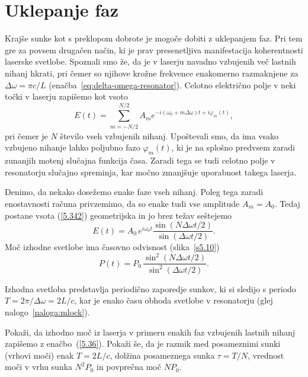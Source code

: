\section{Uklepanje faz}
\label{chap:Uklepanje}
Krajše sunke kot s preklopom dobrote je mogoče dobiti z uklepanjem faz.
Pri tem gre za povsem drugačen način, ki je prav presenetljiva manifestacija 
koherentnosti laserske svetlobe. Spoznali smo že, da je v laserju navadno 
vzbujenih več lastnih nihanj hkrati, pri čemer so njihove krožne frekvence 
enakomerno razmaknjene za $\Delta \omega =\pi c/L$ 
(enačba~\ref{eq:delta-omega-resonator}). Celotno električno
polje v neki točki v laserju zapišemo kot vsoto 
\begin{equation}
E(t)=\sum_{m=-N/2}^{N/2}A_{m}e^{-i(\omega _{0}+m\Delta \omega )t+i\varphi
_{m}(t)},
\label{5.342}
\end{equation}
pri čemer je $N$ število vseh vzbujenih nihanj. Upoštevali smo, da ima vsako
vzbujeno nihanje lahko poljubno fazo $\varphi _{m}(t)$, ki je na splošno predvsem
zaradi zunanjih motenj slučajna funkcija časa. Zaradi tega se tudi
celotno polje v resonatorju slučajno spreminja, kar močno zmanjšuje uporabnost
takega laserja.

Denimo, da nekako dosežemo enake faze vseh nihanj. Poleg tega zaradi enostavnosti
računa privzemimo, da so enake tudi vse amplitude $A_{m}= A_0$. Tedaj
postane vsota (\ref{5.342}) geometrijska in jo brez težav seštejemo 
\begin{equation}
E(t)=A_{0}\,e^{i\omega _{0}t}\frac{\sin (N\Delta \omega t/2)}{\sin(\Delta
\omega t/2)}.
\label{5.352}
\end{equation}
Moč izhodne svetlobe ima časovno odvisnost (slika~\ref{s5.10})
\begin{equation}
P(t)=P_{0}\,\frac{\sin ^{2}(N\Delta \omega t/2)}{\sin ^{2}(\Delta \omega t/2)}.
\label{5.36}
\end{equation}

Izhodna svetloba predstavlja periodično zaporedje sunkov, 
ki si sledijo s periodo $T=2\pi /\Delta \omega =2L/c$, kar je enako času obhoda
svetlobe v resonatorju (glej nalogo~\ref{naloga:mlock}). 

\begin{definition}
\label{naloga:mlock}
Pokaži, da izhodno moč iz laserja v primeru enakih faz vzbujenih lastnih nihanj
zapišemo z enačbo~(\ref{5.36}). Pokaži še, da je razmik med posameznimi sunki (vrhovi
moči) enak $T=2L/c$, dolžina posameznega sunka $\tau = T/N$, vrednost moči v vrhu 
sunka $N^{2}P_{0}$ in povprečna moč $NP_{0}$.
\end{definition}

